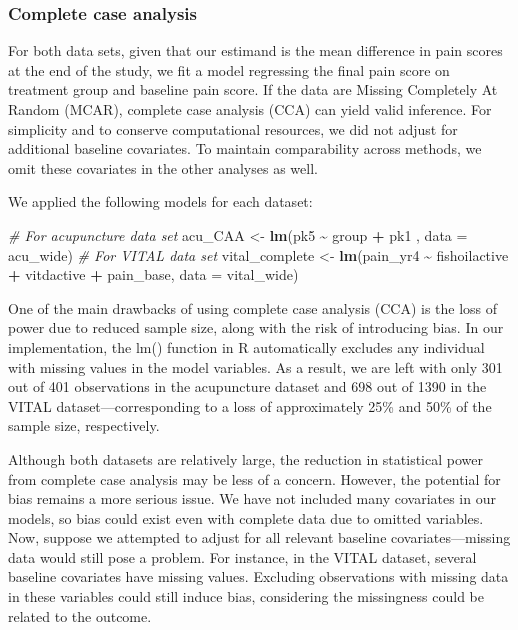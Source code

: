 \documentclass{article}
\newenvironment{Shaded}{\begin{snugshade}}{\end{snugshade}}
\newcommand{\AttributeTok}[1]{\textcolor[rgb]{0.13,0.29,0.53}{#1}}
\newcommand{\CommentTok}[1]{\textcolor[rgb]{0.56,0.35,0.01}{\textit{#1}}}
\newcommand{\FunctionTok}[1]{\textcolor[rgb]{0.13,0.29,0.53}{\textbf{#1}}}
\newcommand{\NormalTok}[1]{#1}
\newcommand{\OtherTok}[1]{\textcolor[rgb]{0.56,0.35,0.01}{#1}}
\newcommand{\SpecialCharTok}[1]{\textcolor[rgb]{0.81,0.36,0.00}{\textbf{#1}}}
\begin{document}
\subsubsection{Complete case analysis}\label{complete-case-analysis}

For both data sets, given that our estimand is the mean difference in
pain scores at the end of the study, we fit a model regressing the final
pain score on treatment group and baseline pain score. If the data are
Missing Completely At Random (MCAR), complete case analysis (CCA) can
yield valid inference. For simplicity and to conserve computational
resources, we did not adjust for additional baseline covariates. To
maintain comparability across methods, we omit these covariates in the
other analyses as well.

We applied the following models for each dataset:

\begin{Shaded}
\begin{Highlighting}[]
\CommentTok{\# For acupuncture data set}
\NormalTok{acu\_CAA }\OtherTok{\textless{}{-}} \FunctionTok{lm}\NormalTok{(pk5 }\SpecialCharTok{\textasciitilde{}}\NormalTok{ group }\SpecialCharTok{+}\NormalTok{ pk1 , }\AttributeTok{data =}\NormalTok{ acu\_wide)}
\CommentTok{\# For VITAL data set}
\NormalTok{vital\_complete }\OtherTok{\textless{}{-}} \FunctionTok{lm}\NormalTok{(pain\_yr4 }\SpecialCharTok{\textasciitilde{}}\NormalTok{ fishoilactive }\SpecialCharTok{+}\NormalTok{ vitdactive }\SpecialCharTok{+}\NormalTok{ pain\_base, }\AttributeTok{data =}\NormalTok{ vital\_wide)}
\end{Highlighting}
\end{Shaded}

One of the main drawbacks of using complete case analysis (CCA) is the
loss of power due to reduced sample size, along with the risk of
introducing bias. In our implementation, the lm() function in R
automatically excludes any individual with missing values in the model
variables. As a result, we are left with only 301 out of 401
observations in the acupuncture dataset and 698 out of 1390 in the VITAL
dataset---corresponding to a loss of approximately 25\% and 50\% of the
sample size, respectively.

Although both datasets are relatively large, the reduction in
statistical power from complete case analysis may be less of a concern.
However, the potential for bias remains a more serious issue. We have
not included many covariates in our models, so bias could exist even
with complete data due to omitted variables. Now, suppose we attempted
to adjust for all relevant baseline covariates---missing data would
still pose a problem. For instance, in the VITAL dataset, several
baseline covariates have missing values. Excluding observations with
missing data in these variables could still induce bias, considering the
missingness could be related to the outcome.
\end{document}
